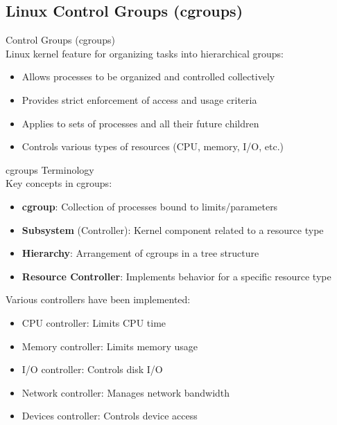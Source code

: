 \subsection{Linux Control Groups (cgroups)}

\begin{definition}{Control Groups (cgroups)}\\
    Linux kernel feature for organizing tasks into hierarchical groups:
    \begin{itemize}
        \item Allows processes to be organized and controlled collectively
        \item Provides strict enforcement of access and usage criteria
        \item Applies to sets of processes and all their future children
        \item Controls various types of resources (CPU, memory, I/O, etc.)
    \end{itemize}
\end{definition}

\begin{definition}{cgroups Terminology}\\
    Key concepts in cgroups:
    \begin{itemize}
        \item \textbf{cgroup}: Collection of processes bound to limits/parameters
        \item \textbf{Subsystem} (Controller): Kernel component related to a resource type
        \item \textbf{Hierarchy}: Arrangement of cgroups in a tree structure
        \item \textbf{Resource Controller}: Implements behavior for a specific resource type
    \end{itemize}
    
    Various controllers have been implemented:
    \begin{itemize}
        \item CPU controller: Limits CPU time
        \item Memory controller: Limits memory usage
        \item I/O controller: Controls disk I/O
        \item Network controller: Manages network bandwidth
        \item Devices controller: Controls device access
    \end{itemize}
\end{definition}

